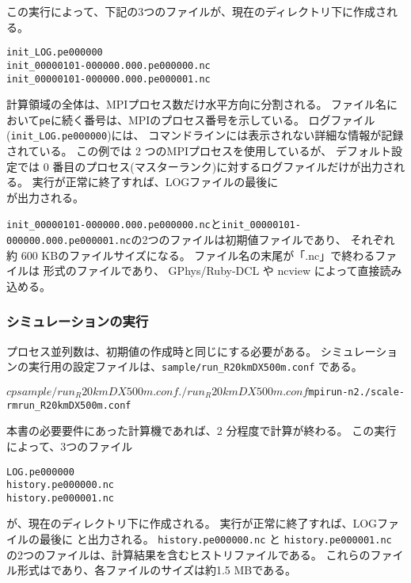 \noindent この実行によって、下記の3つのファイルが、現在のディレクトリ下に作成される。
\begin{alltt}
  init_LOG.pe000000
  init_00000101-000000.000.pe000000.nc
  init_00000101-000000.000.pe000001.nc
\end{alltt}
計算領域の全体は、MPIプロセス数だけ水平方向に分割される。
ファイル名において\verb|pe|に続く番号は、MPIのプロセス番号を示している。
ログファイル(\verb|init_LOG.pe000000|)には、
コマンドラインには表示されない詳細な情報が記録されている。
この例では 2 つのMPIプロセスを使用しているが、
デフォルト設定では 0 番目のプロセス(マスターランク)に対するログファイルだけが出力される。
実行が正常に終了すれば、LOGファイルの最後に\\
が出力される。

\verb|init_00000101-000000.000.pe000000.nc|と\verb|init_00000101-000000.000.pe000001.nc|の2つのファイルは初期値ファイルであり、
それぞれ約 600 KBのファイルサイズになる。
ファイル名の末尾が「.nc」で終わるファイルは {\netcdf}形式のファイルであり、
GPhys/Ruby-DCL や ncview によって直接読み込める。


\subsubsection{シミュレーションの実行} \label{subsec:ideal_exp_run}
プロセス並列数は、初期値の作成時と同じにする必要がある。
シミュレーションの実行用の設定ファイルは、\verb|sample/run_R20kmDX500m.conf| である。
\begin{alltt}
  $ cp  sample/run_R20kmDX500m.conf  ./run_R20kmDX500m.conf
  $ mpirun  -n  2  ./scale-rm  run_R20kmDX500m.conf
\end{alltt}

本書の必要要件にあった計算機であれば、2 分程度で計算が終わる。
この実行によって、3つのファイル
\begin{alltt}
  LOG.pe000000
  history.pe000000.nc
  history.pe000001.nc
\end{alltt}
が、現在のディレクトリ下に作成される。
実行が正常に終了すれば、LOGファイルの最後に
と出力される。
\verb|history.pe000000.nc| と \verb|history.pe000001.nc|
の2つのファイルは、計算結果を含むヒストリファイルである。
これらのファイル形式は{\netcdf}であり、各ファイルのサイズは約1.5 MBである。
